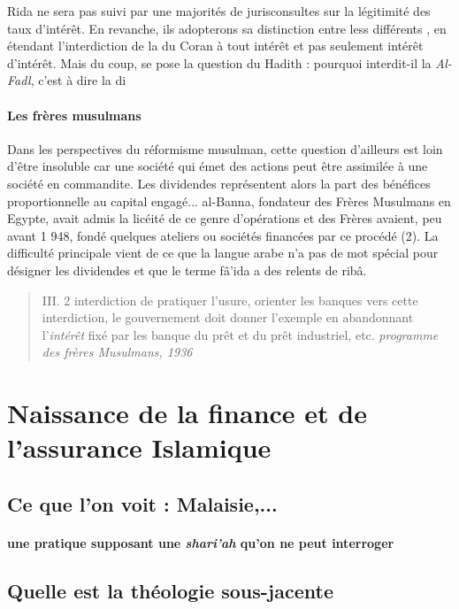  Rida ne sera pas suivi par une majorités de jurisconsultes sur la légitimité des taux d'intérêt. En revanche, ils adopterons sa distinction entre less différents \riba, en étendant l'interdiction de la \riba du Coran à tout intérêt et pas seulement intérêt d'intérêt. Mais du coup, se pose la question du Hadith : pourquoi interdit-il  la \rib \emph{Al-Fadl}, c'est à dire la di
 
 

 
\paragraph{Les frères musulmans}
Dans les perspectives du réformisme musulman,
cette question d'ailleurs est loin d'être insoluble car une société qui émet des
actions peut être assimilée à une société en commandite. Les dividendes
représentent alors la part des bénéfices proportionnelle au capital engagé... 
al-Banna, fondateur des Frères Musulmans en Egypte, avait admis la licéité de ce
genre d'opérations et des Frères avaient, peu avant 1 948, fondé quelques ateliers
ou sociétés financées par ce procédé (2). La difficulté principale vient de ce que la
langue arabe n'a pas de mot spécial pour désigner les dividendes et que le terme
fâ'ida a des relents de ribâ.
\begin{quote}
    III. 2 interdiction de pratiquer l'usure, orienter les banques vers cette interdiction, le gouvernement doit donner l'exemple en abandonnant l'\textit{intérêt} fixé par les banque du prêt et du prêt industriel, etc. \textit{programme des frères Musulmans, 1936}
\end{quote}
\section{Naissance de la finance et de l'assurance Islamique}

\subsection{Ce que l'on voit : Malaisie,...} 

\paragraph{une pratique supposant une \textit{shari'ah} qu'on ne peut interroger}

\subsection{Quelle est la théologie sous-jacente}

